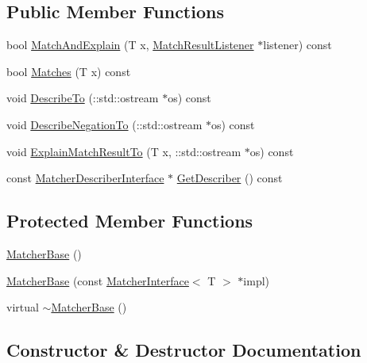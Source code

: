 \subsection*{Public Member Functions}
\begin{DoxyCompactItemize}
\item 
bool \hyperlink{classtesting_1_1internal_1_1_matcher_base_a08429a6d7e7d330de4a4eb4e272105a7}{Match\+And\+Explain} (T x, \hyperlink{classtesting_1_1_match_result_listener}{Match\+Result\+Listener} $\ast$listener) const
\item 
bool \hyperlink{classtesting_1_1internal_1_1_matcher_base_a3b479673ff40cac1a7d548e91d789cb2}{Matches} (T x) const
\item 
void \hyperlink{classtesting_1_1internal_1_1_matcher_base_a7e0c883c7745e0d646463077ef1c1267}{Describe\+To} (\+::std\+::ostream $\ast$os) const
\item 
void \hyperlink{classtesting_1_1internal_1_1_matcher_base_ac1089d49b6b8a381900618985cd69b7f}{Describe\+Negation\+To} (\+::std\+::ostream $\ast$os) const
\item 
void \hyperlink{classtesting_1_1internal_1_1_matcher_base_ad7815191a01d24e20eda2e0057d33aa3}{Explain\+Match\+Result\+To} (T x, \+::std\+::ostream $\ast$os) const
\item 
const \hyperlink{classtesting_1_1_matcher_describer_interface}{Matcher\+Describer\+Interface} $\ast$ \hyperlink{classtesting_1_1internal_1_1_matcher_base_a9b816eb60ee16780703768d704c105e3}{Get\+Describer} () const
\end{DoxyCompactItemize}
\subsection*{Protected Member Functions}
\begin{DoxyCompactItemize}
\item 
\hyperlink{classtesting_1_1internal_1_1_matcher_base_a7214ff6bbe5d13d5ee01fc09c7114e1d}{Matcher\+Base} ()
\item 
\hyperlink{classtesting_1_1internal_1_1_matcher_base_aed3e080f12ea7bde535ddf02b6f66922}{Matcher\+Base} (const \hyperlink{classtesting_1_1_matcher_interface}{Matcher\+Interface}$<$ T $>$ $\ast$impl)
\item 
virtual \hyperlink{classtesting_1_1internal_1_1_matcher_base_a6f8cbfaa5fa9205f297d84fb1741d9c3}{$\sim$\+Matcher\+Base} ()
\end{DoxyCompactItemize}


\subsection{Constructor \& Destructor Documentation}
\mbox{\label{classtesting_1_1internal_1_1_matcher_base_a7214ff6bbe5d13d5ee01fc09c7114e1d}} 
